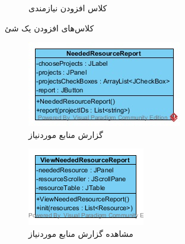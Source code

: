 \begin{figure}[H]
\begin{subfigure}[b]{0.2\textwidth}
		\caption{کلاس افزودن نیازمندی}
	\end{subfigure}
	\caption{کلاس‌های افزودن یک شئ}
\end{figure}


\begin{figure}[H]
	\centering
	\begin{subfigure}[b]{0.3\textwidth}
		\includegraphics[width=\textwidth]{img/class-design/ui/NeededResourceReport.jpg}
		\caption{ گزارش منابع موردنیاز}
	\end{subfigure}
	\begin{subfigure}[b]{0.3\textwidth}
		\includegraphics[width=\textwidth]{img/class-design/ui/ViewNeededResourceReport.png}
		\caption{مشاهده گزارش منابع موردنیاز}
	\end{subfigure}
	\begin{subfigure}[b]{0.3\textwidth}

\end{subfigure}
\end{figure}
